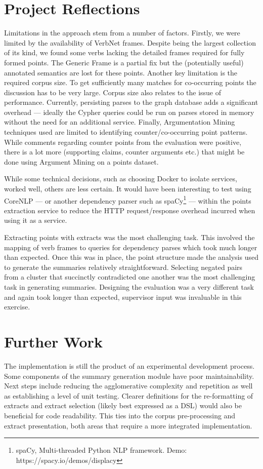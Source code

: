   \section{Project Reflections}
    Limitations in the approach stem from a number of factors. Firstly, we were limited by the availability of VerbNet frames. Despite being the largest collection of its kind, we found some verbs lacking the detailed frames required for fully formed points. The Generic Frame is a partial fix but the (potentially useful) annotated semantics are lost for these points.
    Another key limitation is the required corpus size. To get sufficiently many matches for co-occurring points the discussion has to be very large. Corpus size also relates to the issue of performance. Currently, persisting parses to the graph database adds a significant overhead --- ideally the Cypher queries could be run on parses stored in memory without the need for an additional service.
    Finally, Argumentation Mining techniques used are limited to identifying counter/co-occurring point patterns. While comments regarding counter points from the evaluation were positive, there is a lot more (supporting claims, counter arguments etc.) that might be done using Argument Mining on a points dataset.

    While some technical decisions, such as choosing Docker to isolate services, worked well, others are less certain. It would have been interesting to test using CoreNLP --- or another dependency parser such as spaCy\footnote{spaCy, Multi-threaded Python NLP framework. Demo: https://spacy.io/demos/displacy} --- within the points extraction service to reduce the HTTP request/response overhead incurred when using it as a service.

    Extracting points with extracts was the most challenging task. This involved the mapping of verb frames to queries for dependency parses which took much longer than expected. Once this was in place, the point structure made the analysis used to generate the summaries relatively straightforward. Selecting negated pairs from a cluster that succinctly contradicted one another was the most challenging task in generating summaries. Designing the evaluation was a very different task and again took longer than expected, supervisor input was invaluable in this exercise.

  \section{Further Work}
    The implementation is still the product of an experimental development process. Some components of the summary generation module have poor maintainability. Next steps include reducing the agglomerative complexity and repetition as well as establishing a level of unit testing. Clearer definitions for the re-formatting of extracts and extract selection (likely best expressed as a DSL) would also be beneficial for code readability. This ties into the corpus pre-processing and extract presentation, both areas that require a more integrated implementation.

